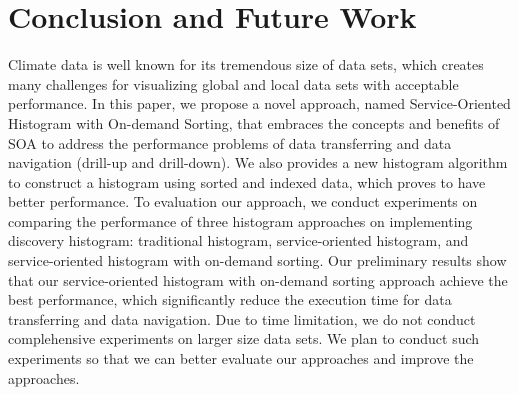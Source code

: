 \documentclass[times, 10pt,onecolumn]{article} %
\begin{document}
\section{Conclusion and Future Work}
Climate data is well known for its tremendous size of data sets, which creates many challenges for visualizing global and local data sets with acceptable performance. In this paper, we propose a novel approach, named Service-Oriented Histogram with On-demand Sorting, that embraces the concepts and benefits of SOA to address the performance problems of data transferring and data navigation (drill-up and drill-down). We also provides a new histogram algorithm to construct a histogram using sorted and indexed data, which proves to have better performance. To evaluation our approach, we conduct experiments on comparing the performance of three histogram approaches on implementing discovery histogram: traditional histogram, service-oriented histogram, and service-oriented histogram with on-demand sorting. Our preliminary results show that our service-oriented histogram with on-demand sorting approach achieve the best performance, which significantly reduce the execution time for data transferring and data navigation. Due to time limitation, we do not conduct complehensive experiments on larger size data sets. We plan to conduct such experiments so that we can better evaluate our approaches and improve the approaches.



\end{document}
